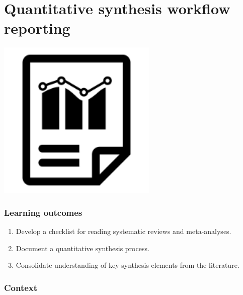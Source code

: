 \documentclass[
]{book}
\providecommand{\tightlist}{%
  \setlength{\itemsep}{0pt}\setlength{\parskip}{0pt}}
\begin{document}
\hypertarget{reporting}{%
\chapter{Quantitative synthesis workflow reporting}\label{reporting}}

\includegraphics[width=3in,height=\textheight]{./report.png}

\hypertarget{learning-outcomes-2}{%
\subsection*{Learning outcomes}\label{learning-outcomes-2}}

\begin{enumerate}
\def\labelenumi{\arabic{enumi}.}
\tightlist
\item
  Develop a checklist for reading systematic reviews and meta-analyses.\\
\item
  Document a quantitative synthesis process.\\
\item
  Consolidate understanding of key synthesis elements from the literature.
\end{enumerate}

\hypertarget{context-1}{%
\subsection*{Context}\label{context-1}}
\end{document}
